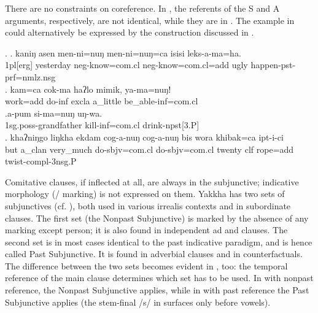 There are no constraints on coreference. In \Next[a], the referents of the  S and A arguments, respectively, are not identical, while  they are in \Next[b]. The example in \Next[a] could alternatively be expressed by the  construction discussed  in . 
		
\ex. \ag.	kaniŋ asen      men-ni=nuŋ         men-ni=nuŋ=ca                isisi leks-a-ma=ha.\\
{\sc  1pl[erg]} yesterday {\sc neg-}know{\sc =com.cl} {\sc neg-}know{\sc =com.cl=add} ugly happen{\sc [3sg]-pst-prf=nmlz.nsg}\\
 
\bg. kam=ca         cok-ma            haʔlo mimik,   ya-ma=nuŋǃ\\
work{\sc =add} do{\sc -inf} {\sc excla} a\_little be\_able{\sc -inf=com.cl}\\
   
\bg.a-pum si-ma=nuŋ uŋ-wa.\\
{\sc 1sg.poss-}grandfather kill{\sc -inf=com.cl} drink{\sc -npst[3.P]}\\
	   \bg.	khaʔniŋgo liŋkha   ekdam     cog-a-nuŋ        cog-a-nuŋ       bis  wora khibak=ca  ipt-i-ci\\
	but a\_clan very\_much do{\sc [3sg]-sbjv=com.cl} do{\sc [3sg]-sbjv=com.cl} twenty {\sc clf}  rope{\sc =add} twist{\sc [3sg.A]-compl-3nsg.P}\\
		 	


Comitative clauses, if inflected at all, are always in the subjunctive; indicative morphology (/ marking) is not expressed on them. Yakkha has two sets of subjunctives (cf. ), both used in various irrealis contexts and in subordinate clauses. The first set (the Nonpast Subjunctive) is marked by the absence of any marking except person; it is also found in independent ad and  clauses. The second set is in most cases identical to the past indicative paradigm, and is hence called Past Subjunctive. It is found in adverbial clauses and in counterfactuals. The difference between the two sets becomes evident in , too: the temporal reference of the main clause determines which set has to be used. In \Next[a] with nonpast reference, the Nonpast Subjunctive applies, while in \Next[b] with past reference the Past Subjunctive applies (the stem-final /s/ in \Next[b] surfaces only before vowels).


